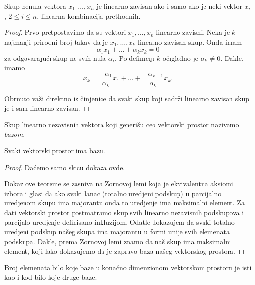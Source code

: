 \documentclass{article}
\begin{document}
\begin{theorem}
  Skup nenula vektora $x_1, \ldots, x_n$ je linearno zavisan ako i samo ako je neki vektor $x_i$, $2 \le i \le n$, linearna kombinacija prethodnih.
\end{theorem}

\begin{proof}
  Prvo pretpostavimo da su vektori $x_1 , \ldots, x_n$ linearno zavisni.
  Neka je $k$ najmanji prirodni broj takav da je $x_1 , \ldots, x_k$ linearno zavisan skup.
  Onda imam 
  \[\alpha_1 x_1 + \ldots + \alpha_k x_k = 0\]
  za odgovarajući skup ne svih nula $\alpha_i$.
  Po definiciji $k$ očigledno je $\alpha_k \neq 0$.
  Dakle, imamo
  \[x_k = \frac{-\alpha_1}{\alpha_k} x_1 + \ldots + \frac{-\alpha_{k - 1}}{\alpha_k} x_k.\]

  Obrnuto važi direktno iz činjenice da svaki skup koji sadrži linearno zavisan skup je i sam linearno zavisan.
\end{proof}

\begin{definition}[Baza]
  Skup linearno nezavisnih vektora koji generišu ceo vektorski prostor nazivamo \textit{bazom}.
\end{definition}

\begin{theorem}
  Svaki vektorski prostor ima bazu.
\end{theorem}

\begin{proof}
  Daćemo samo skicu dokaza ovde.

  Dokaz ove teoreme se zasniva na Zornovoj lemi koja je ekvivalentna aksiomi izbora i glasi da ako svaki lanac (totalno uredjeni podskup) u parcijalno uredjenom skupu ima majorantu onda to uredjenje ima maksimalni element.
  Za dati vektorski prostor postmatramo skup svih linearno nezavisnih podskupova i parcijalo uredjenje definisano inkluzijom.
  Odatle dokazujem da svaki totalno uredjeni podskup našeg skupa ima majorantu u formi unije svih elemenata podskupa.
  Dakle, prema Zornovoj lemi znamo da naš skup ima maksimalni element, koji lako dokazujemo da je zapravo baza našeg vektorskog prostora.
\end{proof}

\begin{theorem}
  Broj elemenata bilo koje baze u konačno dimenzionom vektorskom prostoru je isti kao i kod bilo koje druge baze.
\end{theorem}
\end{document}
